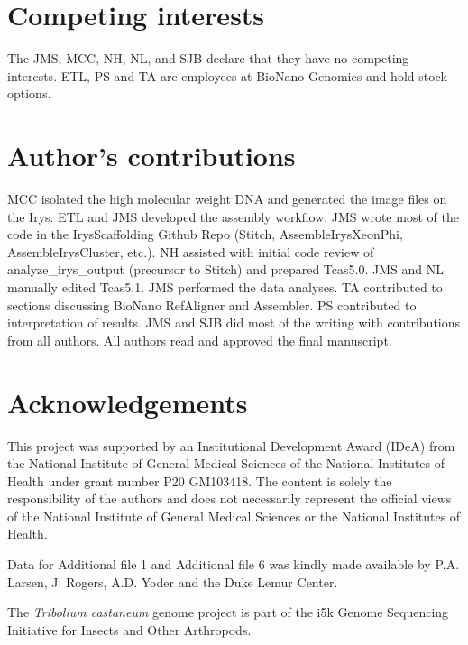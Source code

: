 \documentclass{bmcart}
\begin{document}
\begin{backmatter}

\section*{Competing interests}
  The JMS, MCC, NH, NL, and SJB declare that they have no competing interests. ETL, PS and TA are employees at BioNano Genomics and hold stock options. 


\section*{Author's contributions}
MCC isolated the high molecular weight DNA and generated the image files on the Irys. ETL and JMS developed the assembly workflow. JMS wrote most of the code in the IrysScaffolding Github Repo (Stitch, AssembleIrysXeonPhi, AssembleIrysCluster, etc.). NH assisted with initial code review of analyze\_irys\_output (precursor to Stitch) and prepared Tcas5.0. JMS and NL manually edited Tcas5.1. JMS performed the data analyses. TA contributed to sections discussing BioNano RefAligner and Assembler. PS contributed to interpretation of results. JMS and SJB did most of the writing with contributions from all authors. All authors read and approved the final manuscript.

\section*{Acknowledgements}
  This project was supported by an Institutional Development Award (IDeA) from the National Institute of General Medical Sciences of the National Institutes of Health under grant number P20 GM103418. The content is solely the responsibility of the authors and does not necessarily represent the official views of the National Institute of General Medical Sciences or the National Institutes of Health.

Data for Additional file 1 and Additional file 6 was kindly made available by P.A. Larsen, J. Rogers, A.D. Yoder and the Duke Lemur Center.

The \textit{Tribolium castaneum} genome project is part of the i5k Genome Sequencing Initiative for Insects and Other Arthropods.


\end{backmatter}
\end{document}
